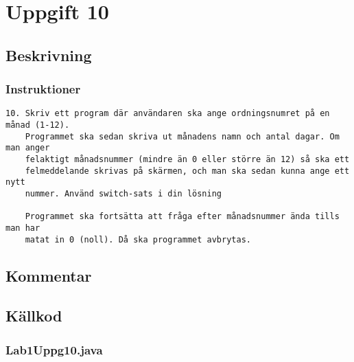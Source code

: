 \section{Uppgift 10}\label{uppgift-10}

\subsection{Beskrivning}

\subsubsection*{Instruktioner}
\begin{verbatim}
10. Skriv ett program där användaren ska ange ordningsnumret på en månad (1-12).
    Programmet ska sedan skriva ut månadens namn och antal dagar. Om man anger
    felaktigt månadsnummer (mindre än 0 eller större än 12) så ska ett
    felmeddelande skrivas på skärmen, och man ska sedan kunna ange ett nytt
    nummer. Använd switch-sats i din lösning

    Programmet ska fortsätta att fråga efter månadsnummer ända tills man har
    matat in 0 (noll). Då ska programmet avbrytas.
\end{verbatim}


\subsection{Kommentar}

\subsection{Källkod}\label{uppgift-10_src}
\subsubsection*{Lab1Uppg10.java}
\inputminted[]{java}{src/Lab1Uppg10.java}
